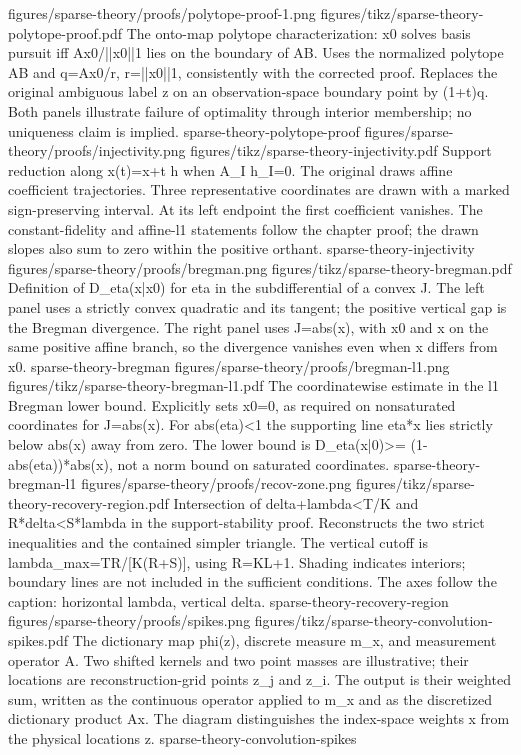 {figures/sparse-theory/proofs/polytope-proof-1.png}
{figures/tikz/sparse-theory-polytope-proof.pdf}
{The onto-map polytope characterization: x0 solves basis pursuit iff Ax0/||x0||1 lies on the boundary of AB.}
{Uses the normalized polytope AB and q=Ax0/r, r=||x0||1, consistently with the corrected proof. Replaces the original ambiguous label z on an observation-space boundary point by (1+t)q. Both panels illustrate failure of optimality through interior membership; no uniqueness claim is implied.}
{sparse-theory-polytope-proof}
{figures/sparse-theory/proofs/injectivity.png}
{figures/tikz/sparse-theory-injectivity.pdf}
{Support reduction along x(t)=x+t h when A\_I h\_I=0.}
{The original draws affine coefficient trajectories. Three representative coordinates are drawn with a marked sign-preserving interval. At its left endpoint the first coefficient vanishes. The constant-fidelity and affine-l1 statements follow the chapter proof; the drawn slopes also sum to zero within the positive orthant.}
{sparse-theory-injectivity}
{figures/sparse-theory/proofs/bregman.png}
{figures/tikz/sparse-theory-bregman.pdf}
{Definition of D\_eta(x|x0) for eta in the subdifferential of a convex J.}
{The left panel uses a strictly convex quadratic and its tangent; the positive vertical gap is the Bregman divergence. The right panel uses J=abs(x), with x0 and x on the same positive affine branch, so the divergence vanishes even when x differs from x0.}
{sparse-theory-bregman}
{figures/sparse-theory/proofs/bregman-l1.png}
{figures/tikz/sparse-theory-bregman-l1.pdf}
{The coordinatewise estimate in the l1 Bregman lower bound.}
{Explicitly sets x0=0, as required on nonsaturated coordinates for J=abs(x). For abs(eta)<1 the supporting line eta*x lies strictly below abs(x) away from zero. The lower bound is D\_eta(x|0)>= (1-abs(eta))*abs(x), not a norm bound on saturated coordinates.}
{sparse-theory-bregman-l1}
{figures/sparse-theory/proofs/recov-zone.png}
{figures/tikz/sparse-theory-recovery-region.pdf}
{Intersection of delta+lambda<T/K and R*delta<S*lambda in the support-stability proof.}
{Reconstructs the two strict inequalities and the contained simpler triangle. The vertical cutoff is lambda\_max=TR/[K(R+S)], using R=KL+1. Shading indicates interiors; boundary lines are not included in the sufficient conditions. The axes follow the caption: horizontal lambda, vertical delta.}
{sparse-theory-recovery-region}
{figures/sparse-theory/proofs/spikes.png}
{figures/tikz/sparse-theory-convolution-spikes.pdf}
{The dictionary map phi(z), discrete measure m\_x, and measurement operator A.}
{Two shifted kernels and two point masses are illustrative; their locations are reconstruction-grid points z\_j and z\_i. The output is their weighted sum, written as the continuous operator applied to m\_x and as the discretized dictionary product Ax. The diagram distinguishes the index-space weights x from the physical locations z.}
{sparse-theory-convolution-spikes}
